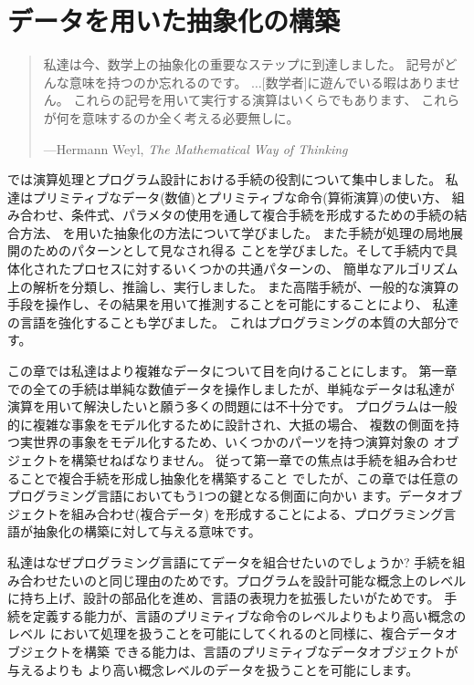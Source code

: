 \chapter{データを用いた抽象化の構築}
\label{Chapter 2}

\begin{quote}
私達は今、数学上の抽象化の重要なステップに到達しました。
記号がどんな意味を持つのか忘れるのです。
\( \dots \)[数学者]に遊んでいる暇はありません。
これらの記号を用いて実行する演算はいくらでもあります、
これらが何を意味するのか全く考える必要無しに。

---Hermann Weyl, \textit{The Mathematical Way of Thinking}
\end{quote}

\vspace{1.0em}

\noindent
{}では演算処理とプログラム設計における手続の役割について集中しました。
私達はプリミティブなデータ(数値)とプリミティブな命令(算術演算)の使い方、
組み合わせ、条件式、パラメタの使用を通して複合手続を形成するための手続の結合方法、
を用いた抽象化の方法について学びました。
また手続が処理の局地展開のためのパターンとして見なされ得る
ことを学びました。そして手続内で具体化されたプロセスに対するいくつかの共通パターンの、
簡単なアルゴリズム上の解析を分類し、推論し、実行しました。
また高階手続が、一般的な演算の手段を操作し、その結果を用いて推測することを可能にすることにより、
私達の言語を強化することも学びました。
これはプログラミングの本質の大部分です。

この章では私達はより複雑なデータについて目を向けることにします。
第一章での全ての手続は単純な数値データを操作しましたが、単純なデータは私達が
演算を用いて解決したいと願う多くの問題には不十分です。
プログラムは一般的に複雑な事象をモデル化するために設計され、大抵の場合、
複数の側面を持つ実世界の事象をモデル化するため、いくつかのパーツを持つ演算対象の
オブジェクトを構築せねばなりません。
従って第一章での焦点は手続を組み合わせることで複合手続を形成し抽象化を構築すること
でしたが、この章では任意のプログラミング言語においてもう1つの鍵となる側面に向かい
ます。データオブジェクトを組み合わせ(複合データ)
を形成することによる、プログラミング言語が抽象化の構築に対して与える意味です。


私達はなぜプログラミング言語にてデータを組合せたいのでしょうか?
手続を組み合わせたいのと同じ理由のためです。プログラムを設計可能な概念上のレベル
に持ち上げ、設計の部品化を進め、言語の表現力を拡張したいがためです。
手続を定義する能力が、言語のプリミティブな命令のレベルよりもより高い概念のレベル
において処理を扱うことを可能にしてくれるのと同様に、複合データオブジェクトを構築
できる能力は、言語のプリミティブなデータオブジェクトが与えるよりも
より高い概念レベルのデータを扱うことを可能にします。




